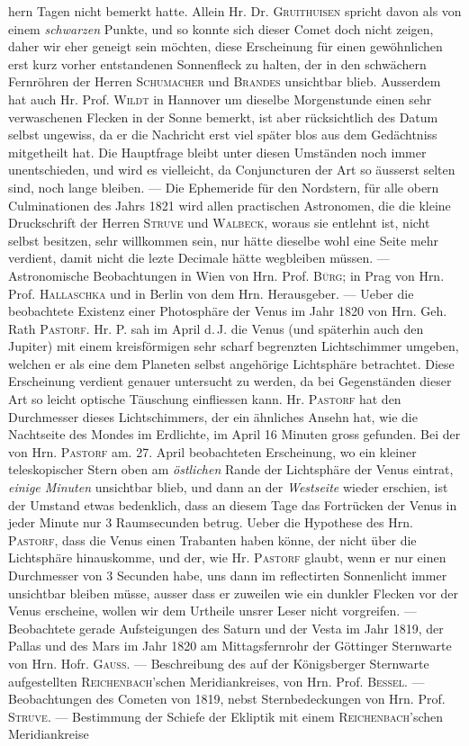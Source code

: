 \noindent hern Tagen nicht bemerkt hatte. Allein Hr. Dr. \textsc{Gruithuisen} spricht davon als von einem \emph{schwarzen} Punkte, und so konnte sich dieser Comet doch nicht zeigen, daher wir eher geneigt sein möchten, diese Erscheinung für einen gewöhnlichen erst kurz vorher entstandenen Sonnenfleck zu halten, der in den schwächern Fernröhren der Herren \textsc{Schumacher} und \textsc{Brandes} unsichtbar blieb. Ausserdem hat auch Hr. Prof. \textsc{Wildt} in Hannover um dieselbe Morgenstunde einen sehr verwaschenen Flecken in der Sonne bemerkt, ist aber rücksichtlich des Datum selbst ungewiss, da er die Nachricht erst viel später blos aus dem Gedächtniss mitgetheilt hat. Die Hauptfrage bleibt unter diesen Umständen noch immer unentschieden, und wird es vielleicht, da Conjuncturen der Art so äusserst selten sind, noch lange bleiben. --- Die Ephemeride für den Nordstern, für alle obern Culminationen des Jahrs 1821 wird allen practischen Astronomen, die die kleine Druckschrift der Herren \textsc{Struve} und \textsc{Walbeck}, woraus sie entlehnt ist, nicht selbst besitzen, sehr willkommen sein, nur hätte dieselbe wohl eine Seite mehr verdient, damit nicht die lezte Decimale hätte wegbleiben müssen. --- Astronomische Beobachtungen in Wien von Hrn. Prof. \textsc{Bürg}; in Prag von Hrn. Prof. \textsc{Hallaschka} und in Berlin von dem Hrn. Herausgeber. --- Ueber die beobachtete Existenz einer Photosphäre der Venus im Jahr 1820 von Hrn. Geh. Rath \textsc{Pastorf}. Hr. P. sah im April d.\,J. die Venus (und späterhin auch den Jupiter) mit einem kreisförmigen sehr scharf begrenzten Lichtschimmer umgeben, welchen er als eine dem Planeten selbst angehörige Lichtsphäre betrachtet. Diese Erscheinung verdient genauer untersucht zu werden, da bei Gegenständen dieser Art so leicht optische Täuschung einfliessen kann. Hr. \textsc{Pastorf} hat den Durchmesser dieses Lichtschimmers, der ein ähnliches Ansehn hat, wie die Nachtseite des Mondes im Erdlichte, im April 16 Minuten gross gefunden. Bei der von Hrn. \textsc{Pastorf} am. 27. April beobachteten Erscheinung, wo ein kleiner teleskopischer Stern oben am \emph{östlichen} Rande der Lichtsphäre der Venus eintrat, \emph{einige Minuten} unsichtbar blieb, und dann an der \emph{Westseite} wieder erschien, ist der Umstand etwas bedenklich, dass an diesem Tage das Fortrücken der Venus in jeder Minute nur 3 Raumsecunden betrug. Ueber die Hypothese des Hrn. \textsc{Pastorf}, dass die Venus einen Trabanten haben könne, der nicht über die Lichtsphäre hinauskomme, und der, wie Hr. \textsc{Pastorf} glaubt, wenn er nur einen Durchmesser von 3 Secunden habe, uns dann im reflectirten Sonnenlicht immer unsichtbar bleiben müsse, ausser dass er zuweilen wie ein dunkler Flecken vor der Venus erscheine, wollen wir dem Urtheile unsrer Leser nicht vorgreifen. --- Beobachtete gerade Aufsteigungen des Saturn und der Vesta im Jahr 1819, der Pallas und des Mars im Jahr 1820 am Mittagsfernrohr der Göttinger Sternwarte von Hrn. Hofr. \textsc{Gauss}. --- Beschreibung des auf der Königsberger Sternwarte aufgestellten \textsc{Reichenbach}'schen Meridiankreises, von Hrn. Prof. \textsc{Bessel}. --- Beobachtungen des Cometen von 1819, nebst Sternbedeckungen von Hrn. Prof. \textsc{Struve}. --- Bestimmung der Schiefe der Ekliptik mit einem \textsc{Reichenbach}'schen Meridiankreise 
